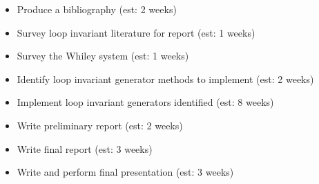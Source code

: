 \documentclass[11pt, a4paper, twoside, openright]{report}
\begin{document}
\begin{itemize}
    \item Produce a bibliography (est: 2 weeks) 
    \item Survey loop invariant literature for report (est: 1 weeks) 
    \item Survey the Whiley system (est: 1 weeks)
    \item Identify loop invariant generator methods to implement (est: 2 weeks)
    \item Implement loop invariant generators identified (est: 8 weeks)
    \item Write preliminary report (est: 2 weeks)

    \item Write final report (est: 3 weeks)
    \item Write and perform final presentation (est: 3 weeks)
\end{itemize}

%
%
%
%
\end{document}
